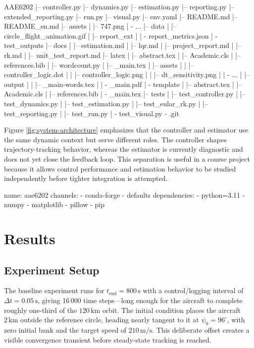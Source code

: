 \documentclass{Academic}
\begin{document}
\begin{projecttreebox}
AAE6202
|-- controller.py
|-- dynamics.py
|-- estimation.py
|-- reporting.py
|-- extended_reporting.py
|-- run.py
|-- visual.py
|-- env.yaml
|-- README.md
|-- README_en.md
|-- assets
|   |-- 747.png
|   \-- ...
|-- data
|   |-- circle_flight_animation.gif
|   |-- report_ext
|   |   \-- report_metrics.json
|   \-- test_outputs
|-- docs
|   |-- estimation.md
|   |-- lqr.md
|   |-- project_report.md
|   |-- rk.md
|   |-- unit_test_report.md
|-- latex
|   |-- abstract.tex
|   |-- Academic.cls
|   |-- references.bib
|   |-- wordcount.py
|   |-- _main.tex
|   |-- assets
|   |   |-- controller_logic.dot
|   |   |-- controller_logic.png
|   |   |-- dt_sensitivity.png
|   |   \-- ...
|   |-- output
|   |   |-- _main-words.tex
|   |   \-- _main.pdf
|   \-- template
|       |-- abstract.tex
|       |-- Academic.cls
|       |-- references.bib
|       \-- _main.tex
|-- tests
|   |-- test_controller.py
|   |-- test_dynamics.py
|   |-- test_estimation.py
|   |-- test_eular_rk.py
|   |-- test_reporting.py
|   |-- test_run.py
|   \-- test_visual.py
\-- .git
\end{projecttreebox}


Figure \ref{fig:system-architecture} emphasizes that the controller and estimator use the same dynamic context but serve different roles. The controller shapes trajectory-tracking behavior, whereas the estimator is currently diagnostic and does not yet close the feedback loop. This separation is useful in a course project because it allows control performance and estimation behavior to be studied independently before tighter integration is attempted.

\begin{yamlcodebox}
name: aae6202
channels:
  - conda-forge
  - defaults
dependencies:
  - python=3.11
  - numpy
  - matplotlib
  - pillow
  - pip
\end{yamlcodebox}



\section{Results}

\subsection{Experiment Setup}

The baseline experiment runs for \(t_{\mathrm{end}} = 800\,\mathrm{s}\) with a control/logging interval of \(\Delta t = 0.05\,\mathrm{s}\), giving 16\,000 time steps---long enough for the aircraft to complete roughly one-third of the \(120\,\mathrm{km}\) orbit. The initial condition places the aircraft \(2\,\mathrm{km}\) outside the reference circle, heading nearly tangent to it at \(\psi_0 = 96^{\circ}\), with zero initial bank and the target speed of \(210\,\mathrm{m/s}\). This deliberate offset creates a visible convergence transient before steady-state tracking is reached.
\end{document}
